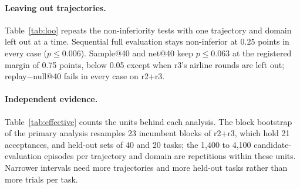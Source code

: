 \documentclass[11pt]{article}
\begin{document}
\paragraph{Leaving out trajectories.} Table~\ref{tab:loo} repeats the non-inferiority tests with one trajectory and domain left out at a time. Sequential full evaluation stays non-inferior at 0.25 points in every case ($p\le0.006$). Sample@40 and net@40 keep $p\le0.063$ at the registered margin of 0.75 points, below 0.05 except when r3's airline rounds are left out; replay$-$null@40 fails in every case on r2+r3.

\begin{table}[t]
\centering
\small
\setlength{\tabcolsep}{2pt}
\caption{Leave one trajectory and domain out (post hoc): difference from full evaluation in points per round and one-sided bootstrap $p$ of non-inferiority (block bootstrap, not adjusted).}
\label{tab:loo}
\end{table}

\paragraph{Independent evidence.} Table~\ref{tab:effective} counts the units behind each analysis. The block bootstrap of the primary analysis resamples 23 incumbent blocks of r2+r3, which hold 21 acceptances, and held-out sets of 40 and 20 tasks; the 1{,}400 to 4{,}100 candidate-evaluation episodes per trajectory and domain are repetitions within these units. Narrower intervals need more trajectories and more held-out tasks rather than more trials per task.

\begin{table}[t]
\centering
\small
\setlength{\tabcolsep}{3pt}
\caption{Size of the independent evidence per trajectory and domain: rounds, measured candidates, full evaluation's acceptances, incumbent blocks (the units of the block bootstrap), evolve and held-out tasks $\times$ trials per candidate, and candidate-evaluation episodes.}
\label{tab:effective}
\end{table}
\end{document}
